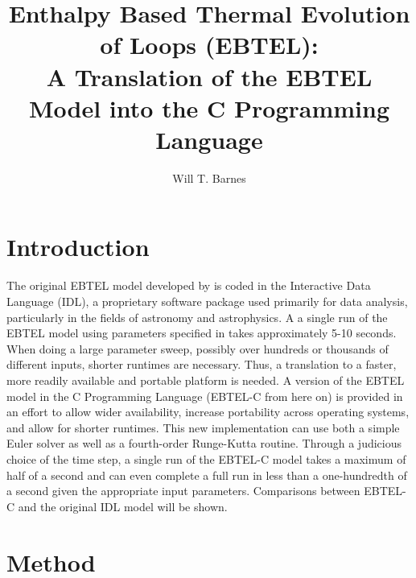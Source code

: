\documentclass[preprint,10pt]{aastex}
\begin{document}
\title{Enthalpy Based Thermal Evolution of Loops (EBTEL):\\ A Translation of the EBTEL Model into the C Programming Language}
\author{Will T. Barnes}

\maketitle

\section{Introduction}
\par The original EBTEL model developed by \citet{klimchuk_highly_2008} is coded in the Interactive Data Language (IDL), a proprietary software package used primarily for data analysis, particularly in the fields of astronomy and astrophysics.  A a single run of the EBTEL model using parameters specified in \citet{cargill_enthalpy-based_2012} takes approximately 5-10 seconds. When doing a large parameter sweep, possibly over hundreds or thousands of different inputs, shorter runtimes are necessary. Thus, a translation to a faster, more readily available and portable platform is needed. A version of the EBTEL model in the C Programming Language (EBTEL-C from here on) is provided in an effort to allow wider availability, increase portability across operating systems, and allow for shorter runtimes. This new implementation can use both a simple Euler solver as well as a fourth-order Runge-Kutta routine. Through a judicious choice of the time step, a single run of the EBTEL-C model takes a maximum of half of a second and can even complete a full run in less than a one-hundredth of a second given the appropriate input parameters. Comparisons between EBTEL-C and the original IDL model will be shown.
%
\section{Method}
\end{document}
